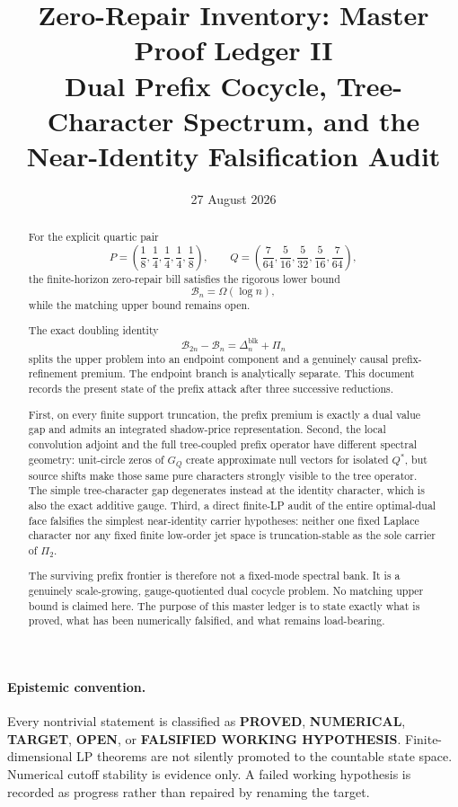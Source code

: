 \documentclass[11pt,a4paper]{article}
\title{\textbf{Zero-Repair Inventory: Master Proof Ledger II}\\[0.35em]
\large Dual Prefix Cocycle, Tree-Character Spectrum, and the Near-Identity Falsification Audit}
\author{}
\date{27 August 2026}
\newcommand{\Bcal}{\mathcal B}
\newcommand{\blk}{\mathrm{blk}}
\newcommand{\PROVED}{\textcolor{green!45!black}{\textbf{PROVED}}}
\newcommand{\NUM}{\textcolor{blue!70!black}{\textbf{NUMERICAL}}}
\newcommand{\TARGET}{\textcolor{orange!80!black}{\textbf{TARGET}}}
\newcommand{\OPEN}{\textcolor{red!70!black}{\textbf{OPEN}}}
\newcommand{\FALSIFIED}{\textcolor{purple!75!black}{\textbf{FALSIFIED WORKING HYPOTHESIS}}}
\begin{document}
\maketitle

\begin{abstract}
For the explicit quartic pair
\[
P=\left(\frac18,\frac14,\frac14,\frac14,\frac18\right),
\qquad
Q=\left(\frac7{64},\frac5{16},\frac5{32},\frac5{16},\frac7{64}\right),
\]
the finite-horizon zero-repair bill satisfies the rigorous lower bound
\[
\Bcal_n=\Omega(\log n),
\]
while the matching upper bound remains open.

The exact doubling identity
\[
\Bcal_{2n}-\Bcal_n
=
\Delta_n^{\blk}+\Pi_n
\]
splits the upper problem into an endpoint component and a genuinely causal
prefix-refinement premium.
The endpoint branch is analytically separate.
This document records the present state of the prefix attack after three
successive reductions.

First, on every finite support truncation, the prefix premium is exactly a
dual value gap and admits an integrated shadow-price representation.
Second, the local convolution adjoint and the full tree-coupled prefix
operator have different spectral geometry: unit-circle zeros of \(G_Q\)
create approximate null vectors for isolated \(Q^*\), but source shifts make
those same pure characters strongly visible to the tree operator.
The simple tree-character gap degenerates instead at the identity character,
which is also the exact additive gauge.
Third, a direct finite-LP audit of the entire optimal-dual face falsifies the
simplest near-identity carrier hypotheses:
neither one fixed Laplace character nor any fixed finite low-order jet space
is truncation-stable as the sole carrier of \(\Pi_2\).

The surviving prefix frontier is therefore not a fixed-mode spectral bank.
It is a genuinely scale-growing, gauge-quotiented dual cocycle problem.
No matching upper bound is claimed here.
The purpose of this master ledger is to state exactly what is proved, what
has been numerically falsified, and what remains load-bearing.
\end{abstract}

\paragraph{Epistemic convention.}
Every nontrivial statement is classified as \PROVED, \NUM, \TARGET,
\OPEN, or \FALSIFIED.
Finite-dimensional LP theorems are not silently promoted to the countable
state space.
Numerical cutoff stability is evidence only.
A failed working hypothesis is recorded as progress rather than repaired by
renaming the target.
\end{document}
